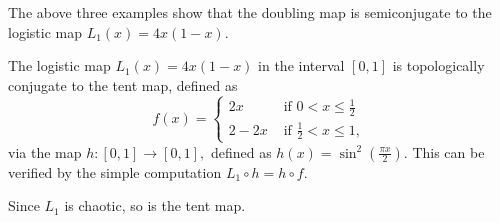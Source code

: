 \begin{example}\label{ex_logistic_and_doubling}
	The above three examples show that the doubling map is semiconjugate to the logistic map $L_1(x) = 4x(1-x)$.
\end{example}

\begin{example}\label{ex:logistic and tent}
	The logistic map $L_1(x) = 4x(1-x)$ in the interval $[0,1]$ is topologically conjugate to the tent map, defined as 
	\begin{equation}
		f(x) = 
		\begin{cases}
			2x   &\text{ if } 0<x \leq \frac{1}{2} \\ 
			2-2x &\text{ if } \frac{1}{2} < x \leq 1,
		\end{cases}
	\end{equation}
	via the map $h: [0,1] \rightarrow [0,1],$ defined as $h(x) = \sin^2(\frac{\pi x}{2})$.
	This can be verified by the simple computation $L_1 \circ h = h \circ f$.

	Since $L_1$ is chaotic, so is the tent map.
\end{example}